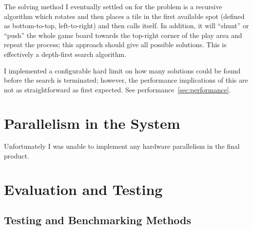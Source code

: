 \documentclass[11pt]{article}
\begin{document}
The solving method I eventually settled on for the problem is a recursive algorithm which rotates and then places a tile in the first available spot (defined as bottom-to-top, left-to-right) and then calls itself.
In addition, it will ``shunt'' or ``push'' the whole game board towards the top-right corner of the play area and repeat the process; this approach should give all possible solutions.
This is effectively a depth-first search algorithm.

I implemented a configurable hard limit on how many solutions could be found before the search is terminated; however, the performance implications of this are not as straightforward as first expected.
See performance~\ref{sec:performance}.

\newpage
\section{Parallelism in the System}


Unfortunately I was unable to implement any hardware parallelism in the final product.

\newpage
\section{Evaluation and Testing}

\subsection{Testing and Benchmarking Methods}\label{sec:testing_benchmarking}

\end{document}
